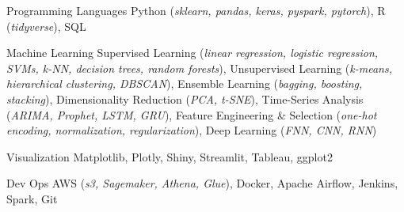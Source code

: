 

\begin{cvskills}

  \cvskill
    {Programming Languages}
    {Python (\small\textit{sklearn, pandas, keras, pyspark, pytorch}), R (\small\textit{tidyverse}), SQL}

  \cvskill
    {Machine Learning}
    {
      Supervised Learning (\small\textit{linear regression, logistic regression, SVMs, k-NN, decision trees, random forests}), 
      Unsupervised Learning (\small\textit{k-means, hierarchical clustering, DBSCAN}), 
      Ensemble Learning (\small\textit{bagging, boosting, stacking}), 
      Dimensionality Reduction (\small\textit{PCA, t-SNE}), 
      Time-Series Analysis (\small\textit{ARIMA, Prophet, LSTM, GRU}), 
      Feature Engineering \& Selection (\small\textit{one-hot encoding, normalization, regularization}),
      Deep Learning (\small\textit{FNN, CNN, RNN})
    }

  \cvskill
    {Visualization}
    {Matplotlib, Plotly, Shiny, Streamlit, Tableau, ggplot2}

  \cvskill
    {Dev Ops}
    {AWS (\small\textit{s3, Sagemaker, Athena, Glue}), Docker, Apache Airflow, Jenkins, Spark, Git}

\end{cvskills}

